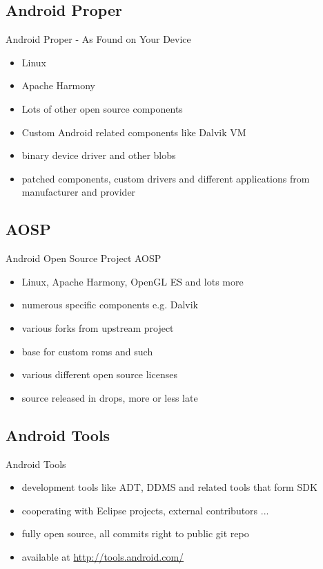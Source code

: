 \documentclass[aspectratio=169]{beamer}
\newcommand{\surl}[1] {{\tiny \url{#1}}}
\begin{document}
  \subsection{Android Proper}
    \begin{frame}{Android Proper - As Found on Your Device}
      \begin{itemize}
        \item<1->Linux
        \item<2->Apache Harmony 
        \item<3->Lots of other open source components
        \item<4->Custom Android related components like Dalvik VM
        \item<5->binary device driver and other blobs 
        \item<6->patched components, custom drivers and different applications from manufacturer and provider
      \end{itemize}
    \end{frame}
  
  \subsection{AOSP}
    \begin{frame}{Android Open Source Project AOSP}
      \begin{itemize}
        \item<1->Linux, Apache Harmony, OpenGL ES and lots more
        \item<2->numerous specific components e.g. Dalvik
        \item<3->various forks from upstream project
        \item<4->base for custom roms and such
        \item<5->various different open source licenses
        \item<6->source released in drops, more or less late
      \end{itemize}
    \end{frame}

  \subsection{Android Tools}
    \begin{frame}{Android Tools}
      \begin{itemize}
        \item<1->development tools like ADT, DDMS and related tools that form SDK 
        \item<2->cooperating with Eclipse projects, external contributors ...
        \item<3->fully open source, all commits right to public git repo
        \item<4->available at \surl{http://tools.android.com/}
      \end{itemize}
    \end{frame}
\end{document}
